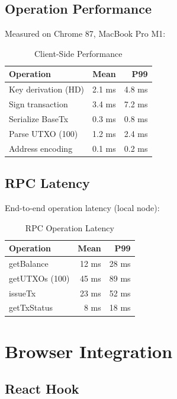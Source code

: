 \documentclass[11pt,twocolumn]{article}
\begin{document}
\subsection{Operation Performance}

Measured on Chrome 87, MacBook Pro M1:

\begin{table}[h]
\centering
\caption{Client-Side Performance}
\begin{tabular}{lrr}
\toprule
\textbf{Operation} & \textbf{Mean} & \textbf{P99} \\
\midrule
Key derivation (HD) & 2.1 ms & 4.8 ms \\
Sign transaction & 3.4 ms & 7.2 ms \\
Serialize BaseTx & 0.3 ms & 0.8 ms \\
Parse UTXO (100) & 1.2 ms & 2.4 ms \\
Address encoding & 0.1 ms & 0.2 ms \\
\bottomrule
\end{tabular}
\end{table}

\subsection{RPC Latency}

End-to-end operation latency (local node):

\begin{table}[h]
\centering
\caption{RPC Operation Latency}
\begin{tabular}{lrr}
\toprule
\textbf{Operation} & \textbf{Mean} & \textbf{P99} \\
\midrule
getBalance & 12 ms & 28 ms \\
getUTXOs (100) & 45 ms & 89 ms \\
issueTx & 23 ms & 52 ms \\
getTxStatus & 8 ms & 18 ms \\
\bottomrule
\end{tabular}
\end{table}

\section{Browser Integration}

\subsection{React Hook}
\end{document}

